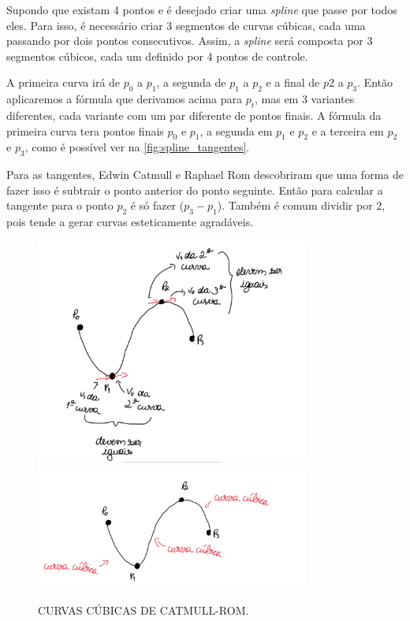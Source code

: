 Supondo que existam 4 pontos e é desejado criar uma \textit{spline} que passe por todos eles. Para isso, é necessário criar 3 segmentos de curvas cúbicas, cada uma passando por dois pontos consecutivos. Assim, a \textit{spline} será composta por 3 segmentos cúbicos, cada um definido por 4 pontos de controle. \cite{CatmullRom}

 A primeira curva irá de $p_0$ a $p_1$, a segunda de $p_1$ a $p_2$ e a final de $p2$ a $p_3$. Então aplicaremos a fórmula que derivamos acima para $p_t$, mas em 3 variantes diferentes, cada variante com um par diferente de pontos finais. A fórmula da primeira curva tera pontos finais $p_0$ e $p_1$, a segunda em $p_1$ e $p_2$ e a terceira em $p_2$ e $p_3$, como é possível ver na \autoref{fig:spline_tangentes}. 
 
 Para as tangentes, Edwin Catmull e Raphael Rom descobriram que uma forma de fazer isso é subtrair o ponto anterior do ponto seguinte. Então para calcular a tangente para o ponto $p_2$ é só fazer ($p_3 - p_1$). Também é comum dividir por 2, pois tende a gerar curvas esteticamente agradáveis.

\begin{figure}[h!]
    \caption{CURVAS CÚBICAS DE CATMULL-ROM.}
    \centering
    \includegraphics[width=0.8\textwidth]{fig/s1.jpg}
    \vspace{0.5em} %
    \includegraphics[width=0.8\textwidth]{fig/s2.jpg}
    \label{fig:spline_tangentes}
\end{figure}

